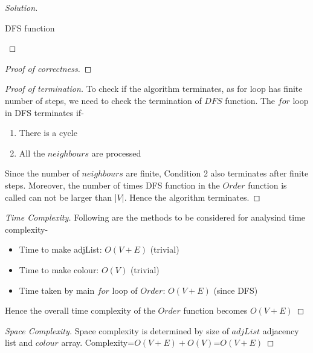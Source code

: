 \begin{solution}{2.1}
\begin{proof}[Solution]
    \begin{algorithm}[H]
        \caption{DFS function}
        \begin{algorithmic}
                 
                 
                \State{\Return{}}
                \EndIf{}
            \EndFor{}
             
             
        \EndProcedure{}
        \end{algorithmic}
    \end{algorithm}
    \end{proof}
    \begin{proof}[Proof of correctness]
    \end{proof}
    \begin{proof}[Proof of termination]
        To check if the algorithm terminates, as for loop has finite number of steps, we need to check the termination of $DFS$ function. The $for$ loop in DFS terminates if-
        \begin{enumerate}
            \item There is a cycle
            \item All the $neighbours$ are processed
        \end{enumerate}
        Since the number of $neighbours$ are finite, Condition 2 also terminates after finite steps.
        Moreover, the number of times DFS function in the $Order$ function is called can not be larger than |$V$|. Hence the algorithm terminates.
    \end{proof}
    \begin{proof}[Time Complexity]
    Following are the methods to be considered for analysind time complexity-
        \begin{itemize}
            \item Time to make adjList: $O(V+E)$ (trivial)
            \item Time to make colour: $O(V)$ (trivial)
            \item Time taken by main $for$ loop of $Order$:
            $O(V+E)$ (since DFS)
        \end{itemize}
        Hence the overall time complexity of the $Order$ function becomes $O(V+E)$
    \end{proof}
    \begin{proof}[Space Complexity]
        Space complexity is determined by size of $adjList$ adjacency list and $colour$ array.
        Complexity=$O(V+E)+O(V)$=$O(V+E)$
    \end{proof}
    
\end{solution}
